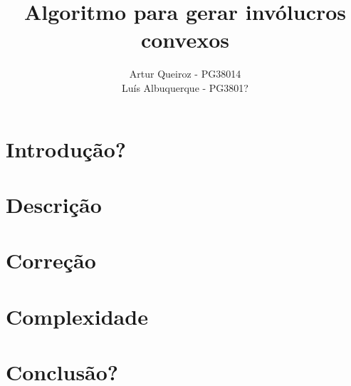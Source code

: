 \documentclass[11pt]{article}
\title{Algoritmo para gerar invólucros convexos}
\author{Artur Queiroz - PG38014\\Luís Albuquerque - PG3801?}
\begin{document}
\maketitle

\section{Introdução?}

\section{Descrição}

\section{Correção}

\section{Complexidade}

\section{Conclusão?}

%
%
%
\end{document}

